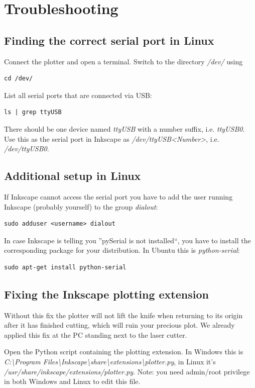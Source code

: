 \chapter{Troubleshooting}
\section{Finding the correct serial port in Linux}
\label{sec:portLinux}
Connect the plotter and open a terminal. Switch to the directory \textit{/dev/} using
\begin{lstlisting}
cd /dev/
\end{lstlisting}
List all serial ports that are connected via USB:
\begin{lstlisting}
ls | grep ttyUSB
\end{lstlisting}
There should be one device named \textit{ttyUSB} with a number suffix, i.e. \textit{ttyUSB0}. Use this as the serial port in Inkscape as \textit{/dev/ttyUSB<Number>}, i.e. \textit{/dev/ttyUSB0}.

\section{Additional setup in Linux}
\label{sec:setupLinux}
If Inkscape cannot access the serial port you have to add the user running Inkscape (probably yourself) to the group \textit{dialout}:
\begin{lstlisting}
sudo adduser <username> dialout
\end{lstlisting}
In case Inkscape is telling you ”pySerial is not installed“, you have to install the corresponding package for your distribution. In Ubuntu this is \textit{python-serial}:
\begin{lstlisting}
sudo apt-get install python-serial
\end{lstlisting}

\section{Fixing the Inkscape plotting extension}
Without this fix the plotter will not lift the knife when returning to its origin after it has finished cutting, which will ruin your precious plot. We already applied this fix at the PC standing next to the laser cutter.

Open the Python script containing the plotting extension. In Windows this is \textit{C:\textbackslash Program Files\textbackslash Inkscape\textbackslash share\textbackslash extensions\textbackslash plotter.py}, in Linux it's \textit{/usr/share/inkscape/extensions/plotter.py}. Note: you need admin/root privilege in both Windows and Linux to edit this file.

